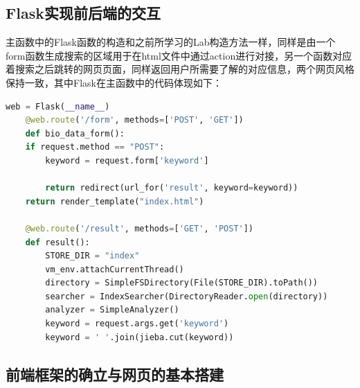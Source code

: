 \documentclass[a4paper,12pt]{article}
\begin{document}
    \subsection{Flask实现前后端的交互}

    主函数中的Flask函数的构造和之前所学习的Lab构造方法一样，同样是由一个form函数生成搜索的区域用于在html文件中通过action进行对接，另一个函数对应着搜索之后跳转的网页页面，同样返回用户所需要了解的对应信息，两个网页风格保持一致，其中Flask在主函数中的代码体现如下：

    \begin{lstlisting}[language=python]
    web = Flask(__name__)
    @web.route('/form', methods=['POST', 'GET'])
    def bio_data_form():
    if request.method == "POST":
        keyword = request.form['keyword']
        
        return redirect(url_for('result', keyword=keyword))
    return render_template("index.html")

    @web.route('/result', methods=['GET', 'POST'])
    def result():
        STORE_DIR = "index"
        vm_env.attachCurrentThread()
        directory = SimpleFSDirectory(File(STORE_DIR).toPath())
        searcher = IndexSearcher(DirectoryReader.open(directory))
        analyzer = SimpleAnalyzer()
        keyword = request.args.get('keyword')
        keyword = ' '.join(jieba.cut(keyword))
    \end{lstlisting}


    \subsection{前端框架的确立与网页的基本搭建}
\end{document}

